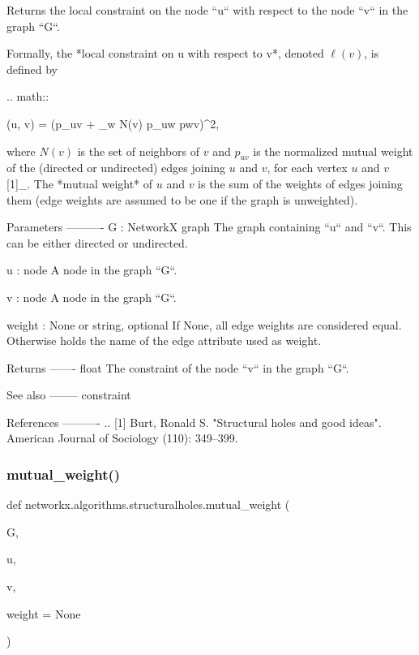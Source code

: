 \begin{DoxyVerb}Returns the local constraint on the node ``u`` with respect to
the node ``v`` in the graph ``G``.

Formally, the *local constraint on u with respect to v*, denoted
$\ell(v)$, is defined by

.. math::

   \ell(u, v) = \left(p_{uv} + \sum_{w \in N(v)} p_{uw} p{wv}\right)^2,

where $N(v)$ is the set of neighbors of $v$ and $p_{uv}$ is the
normalized mutual weight of the (directed or undirected) edges
joining $u$ and $v$, for each vertex $u$ and $v$ [1]_. The *mutual
weight* of $u$ and $v$ is the sum of the weights of edges joining
them (edge weights are assumed to be one if the graph is
unweighted).

Parameters
----------
G : NetworkX graph
    The graph containing ``u`` and ``v``. This can be either
    directed or undirected.

u : node
    A node in the graph ``G``.

v : node
    A node in the graph ``G``.

weight : None or string, optional
  If None, all edge weights are considered equal.
  Otherwise holds the name of the edge attribute used as weight.

Returns
-------
float
    The constraint of the node ``v`` in the graph ``G``.

See also
--------
constraint

References
----------
.. [1] Burt, Ronald S.
       "Structural holes and good ideas".
       American Journal of Sociology (110): 349–399.\end{DoxyVerb}
 \mbox{\label{namespacenetworkx_1_1algorithms_1_1structuralholes_ae88277a5a4f27775a56cf077c759d165}} 
\subsubsection{\texorpdfstring{mutual\+\_\+weight()}{mutual\_weight()}}
{\footnotesize\ttfamily def networkx.\+algorithms.\+structuralholes.\+mutual\+\_\+weight (\begin{DoxyParamCaption}\item[{}]{G,  }\item[{}]{u,  }\item[{}]{v,  }\item[{}]{weight = {\ttfamily None} }\end{DoxyParamCaption})}

